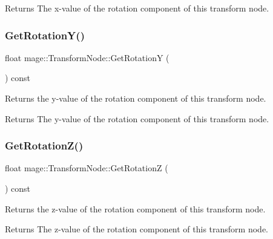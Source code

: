 \begin{DoxyReturn}{Returns}
The x-\/value of the rotation component of this transform node. 
\end{DoxyReturn}
\hypertarget{classmage_1_1_transform_node_ab8e8e698297793281a7c880bdcde3880}{}\label{classmage_1_1_transform_node_ab8e8e698297793281a7c880bdcde3880} 
\subsubsection{\texorpdfstring{Get\+Rotation\+Y()}{GetRotationY()}}
{\footnotesize\ttfamily float mage\+::\+Transform\+Node\+::\+Get\+RotationY (\begin{DoxyParamCaption}{ }\end{DoxyParamCaption}) const}

Returns the y-\/value of the rotation component of this transform node.

\begin{DoxyReturn}{Returns}
The y-\/value of the rotation component of this transform node. 
\end{DoxyReturn}
\hypertarget{classmage_1_1_transform_node_a7cbb269851eb512b19d3b1c0004d7148}{}\label{classmage_1_1_transform_node_a7cbb269851eb512b19d3b1c0004d7148} 
\subsubsection{\texorpdfstring{Get\+Rotation\+Z()}{GetRotationZ()}}
{\footnotesize\ttfamily float mage\+::\+Transform\+Node\+::\+Get\+RotationZ (\begin{DoxyParamCaption}{ }\end{DoxyParamCaption}) const}

Returns the z-\/value of the rotation component of this transform node.

\begin{DoxyReturn}{Returns}
The z-\/value of the rotation component of this transform node. 
\end{DoxyReturn}
\hypertarget{classmage_1_1_transform_node_acb0846fdaf70a8a88c4fe316032b5a0c}{}\label{classmage_1_1_transform_node_acb0846fdaf70a8a88c4fe316032b5a0c} 
